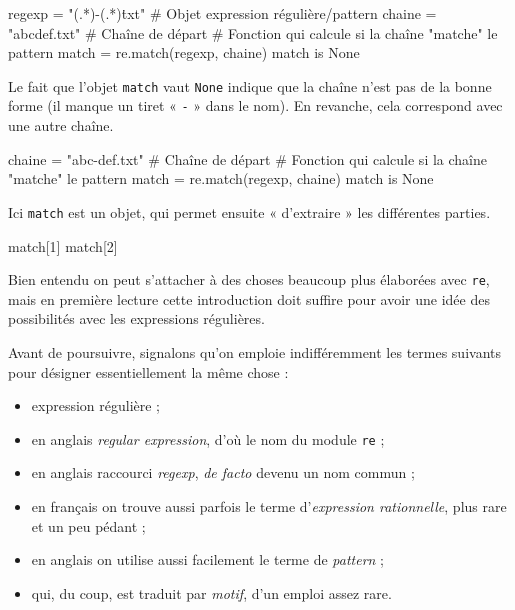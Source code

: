 \begin{idleconsole}
	\begin{pyconsole}
		regexp = "(.*)-(.*)\.txt" # Objet expression régulière/pattern
		chaine = "abcdef.txt" # Chaîne de départ
		# Fonction qui calcule si la chaîne "matche" le pattern
		match = re.match(regexp, chaine)
		match is None
	\end{pyconsole}
\end{idleconsole}

Le fait que l'objet \texttt{match} vaut \texttt{None} indique que la chaîne n'est pas de la bonne forme (il manque un tiret « \texttt{-} » dans le nom). En revanche, cela correspond avec une autre chaîne.

\begin{idleconsole}
	\begin{pyconsole}
		chaine = "abc-def.txt" # Chaîne de départ
		# Fonction qui calcule si la chaîne "matche" le pattern
		match = re.match(regexp, chaine)
		match is None
	\end{pyconsole}
\end{idleconsole}

Ici \texttt{match} est un objet, qui permet ensuite « d'extraire » les différentes parties.

\begin{idleconsole}
	\begin{pyconsole}
		match[1]
		match[2]
	\end{pyconsole}
\end{idleconsole}

Bien entendu on peut s'attacher à des choses beaucoup plus élaborées avec \texttt{re}, mais en première lecture cette introduction doit suffire pour avoir une idée des possibilités avec les expressions régulières.

Avant de poursuivre, signalons qu'on emploie indifféremment les termes suivants pour désigner essentiellement la même chose :
\begin{itemize}
\item expression régulière ;
\item en anglais \textit{regular expression}, d'où le nom du module \texttt{re} ;
\item en anglais raccourci \textit{regexp}, \textit{de facto} devenu un nom commun ;
\item en français on trouve aussi parfois le terme d'\emph{expression rationnelle}, plus rare et un peu pédant ;
\item en anglais on utilise aussi facilement le terme de \textit{pattern} ;
\item qui, du coup, est traduit par \emph{motif}, d'un emploi assez rare.
\end{itemize}

